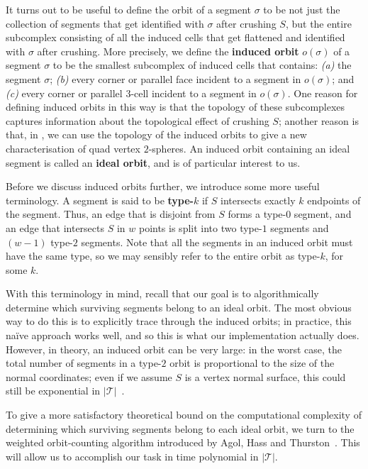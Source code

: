 \documentclass[10pt,a4paper]{amsart}
\newcommand{\tri}{\mathcal{T}}
\begin{document}
It turns out to be useful to define the orbit of a segment $\sigma$ to be not just the collection of segments that get identified with $\sigma$ after crushing $S$,
but the entire subcomplex consisting of all the induced cells that get flattened and identified with $\sigma$ after crushing.
More precisely, we define the \textbf{induced orbit} $o(\sigma)$ of a segment $\sigma$ to be the smallest subcomplex of induced cells that contains:
\emph{(a)} the segment $\sigma$; \emph{(b)} every corner or parallel face incident to a segment in $o(\sigma)$; and \emph{(c)} every corner or parallel $3$-cell incident to a segment in $o(\sigma)$.
One reason for defining induced orbits in this way is that the topology of these subcomplexes captures information about the topological effect of crushing $S$;
another reason is that, in ,
we can use the topology of the induced orbits to give a new characterisation of quad vertex $2$-spheres.
An induced orbit containing an ideal segment is called an \textbf{ideal orbit}, and is of particular interest to us.

Before we discuss induced orbits further, we introduce some more useful terminology.
A segment is said to be \textbf{type-$k$} if $S$ intersects exactly $k$ endpoints of the segment. Thus, an edge that is disjoint from $S$ forms a type-$0$ segment, and an edge that intersects $S$ in $w$ points is split into two type-$1$ segments and $(w-1)$ type-$2$ segments.
Note that all the segments in an induced orbit must have the same type, so we may sensibly refer to the entire orbit as type-$k$, for some $k$.

With this terminology in mind, recall that our goal is to algorithmically determine which surviving segments belong to an ideal orbit.
The most obvious way to do this is to explicitly trace through the induced orbits;
in practice, this na\"{i}ve approach works well, and so this is what our implementation actually does.
However, in theory, an induced orbit can be very large:
in the worst case, the total number of segments in a type-$2$ orbit is proportional to the size of the normal coordinates;
even if we assume $S$ is a vertex normal surface, this could still be exponential in $|\tri|$~\cite[Lemma~6.1]{hass1999computational}.

To give a more satisfactory theoretical bound on the computational complexity of determining which surviving segments belong to each ideal orbit,
we turn to the weighted orbit-counting algorithm introduced by Agol, Hass and Thurston~\cite[Sections~4 and~6]{agol2006computational}.
This will allow us to accomplish our task in time polynomial in $|\tri|$.
\end{document}
